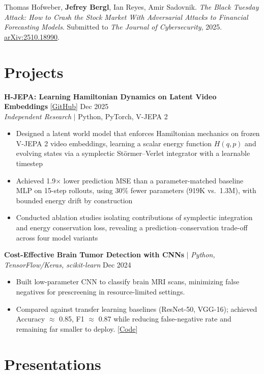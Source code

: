 \documentclass[11pt,letterpaper]{article}
\newcommand{\dates}[1]{\hfill #1}
\begin{document}
Thomas Hofweber, \textbf{Jefrey Bergl}, Ian Reyes, Amir Sadovnik. \textit{The Black Tuesday Attack: How to Crash the Stock Market With Adversarial Attacks to Financial Forecasting Models}. Submitted to \textit{The Journal of Cybersecurity}, 2025. \href{https://arxiv.org/abs/2510.18990}{arXiv:2510.18990}.

\section{Projects}

\textbf{H-JEPA: Learning Hamiltonian Dynamics on Latent Video Embeddings} [\href{https://github.com/jefreybergl/H-JEPA}{GitHub}] \hfill Dec 2025 \\
\textit{Independent Research} $\vert$ Python, PyTorch, V-JEPA 2 \hfill
\begin{itemize}
    \item Designed a latent world model that enforces Hamiltonian mechanics on frozen V-JEPA 2 video embeddings, learning a scalar energy function $H(q,p)$ and evolving states via a symplectic St\"{o}rmer--Verlet integrator with a learnable timestep
    \item Achieved 1.9$\times$ lower prediction MSE than a parameter-matched baseline MLP on 15-step rollouts, using 30\% fewer parameters (919K vs.\ 1.3M), with bounded energy drift by construction
    \item Conducted ablation studies isolating contributions of symplectic integration and energy conservation loss, revealing a prediction--conservation trade-off across four model variants
\end{itemize}

\textbf{Cost-Effective Brain Tumor Detection with CNNs} $\mid$ \textit{Python, TensorFlow/Keras, scikit-learn}
 \dates{Dec 2024} \\[-6pt]
\begin{itemize}
    \item Built low-parameter CNN to classify brain MRI scans, minimizing false negatives for prescreening in resource-limited settings.
    \item Compared against transfer learning baselines (ResNet-50, VGG-16); achieved Accuracy $\approx$ 0.85, F1 $\approx$ 0.87 while reducing false-negative rate and remaining far smaller to deploy. [\href{https://github.com/TrippWhaley/comp-562-final-project/}{Code}]
\end{itemize}

\section{Presentations}
\end{document}
